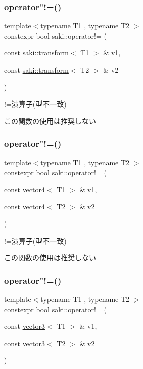 \subsubsection{\texorpdfstring{operator"!=()}{operator!=()}\hspace{0.1cm}{\footnotesize\ttfamily [6/11]}}
{\footnotesize\ttfamily template$<$typename T1 , typename T2 $>$ \\
constexpr bool saki\+::operator!= (\begin{DoxyParamCaption}\item[{const \mbox{\hyperlink{classsaki_1_1transform}{saki\+::transform}}$<$ T1 $>$ \&}]{v1,  }\item[{const \mbox{\hyperlink{classsaki_1_1transform}{saki\+::transform}}$<$ T2 $>$ \&}]{v2 }\end{DoxyParamCaption})}



!=演算子(型不一致) 

この関数の使用は推奨しない \mbox{\label{namespacesaki_abf6f98117a7a12898df59d2041040000}} 
\subsubsection{\texorpdfstring{operator"!=()}{operator!=()}\hspace{0.1cm}{\footnotesize\ttfamily [7/11]}}
{\footnotesize\ttfamily template$<$typename T1 , typename T2 $>$ \\
constexpr bool saki\+::operator!= (\begin{DoxyParamCaption}\item[{const \mbox{\hyperlink{classsaki_1_1vector4}{vector4}}$<$ T1 $>$ \&}]{v1,  }\item[{const \mbox{\hyperlink{classsaki_1_1vector4}{vector4}}$<$ T2 $>$ \&}]{v2 }\end{DoxyParamCaption})}



!=演算子(型不一致) 

この関数の使用は推奨しない \mbox{\label{namespacesaki_ae8393ad670f8bb199a92d4287bb1bf3a}} 
\subsubsection{\texorpdfstring{operator"!=()}{operator!=()}\hspace{0.1cm}{\footnotesize\ttfamily [8/11]}}
{\footnotesize\ttfamily template$<$typename T1 , typename T2 $>$ \\
constexpr bool saki\+::operator!= (\begin{DoxyParamCaption}\item[{const \mbox{\hyperlink{classsaki_1_1vector3}{vector3}}$<$ T1 $>$ \&}]{v1,  }\item[{const \mbox{\hyperlink{classsaki_1_1vector3}{vector3}}$<$ T2 $>$ \&}]{v2 }\end{DoxyParamCaption})}



